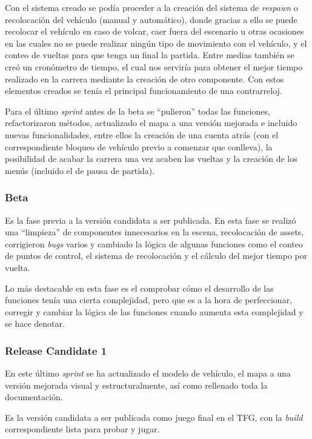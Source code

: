Con el sistema creado se podía proceder a la creación del sistema de \textit{respawn} o recolocación del vehículo (manual y automático), donde gracias a ello se puede recolocar el vehículo en caso de volcar, caer fuera del escenario u otras ocasiones en las cuales no se puede realizar ningún tipo de movimiento con el vehículo, y el conteo de vueltas para que tenga un final la partida. Entre medias también se creó un cronómetro de tiempo, el cual nos serviría para obtener el mejor tiempo realizado en la carrera mediante la creación de otro componente. Con estos elementos creados se tenía el principal funcionamiento de una contrarreloj.

Para el último \textit{sprint} antes de la beta se ``pulieron'' todas las funciones, refactorizaron métodos, actualizado el mapa a una versión mejorada e incluido nuevas funcionalidades, entre ellos la creación de una cuenta atrás (con el correspondiente bloqueo de vehículo previo a comenzar que conlleva), la posibilidad de acabar la carrera una vez acaben las vueltas y la creación de los menús (incluido el de pausa de partida).

\subsubsection{Beta}

Es la fase previa a la versión candidata a ser publicada. En esta fase se realizó una ``limpieza'' de componentes innecesarios en la escena, recolocación de assets, corrigieron \textit{bugs} varios y cambiado la lógica de algunas funciones como el conteo de puntos de control, el sistema de recolocación y el cálculo del mejor tiempo por vuelta.

Lo más destacable en esta fase es el comprobar cómo el desarrollo de las funciones tenía una cierta complejidad, pero que es a la hora de perfeccionar, corregir y cambiar la lógica de las funciones cuando aumenta esta complejidad y se hace denotar.

\subsubsection{Release Candidate 1}

En este último \textit{sprint} se ha actualizado el modelo de vehículo, el mapa a una versión mejorada visual y estructuralmente, así como rellenado toda la documentación.

Es la versión candidata a ser publicada como juego final en el TFG, con la \textit{build} correspondiente lista para probar y jugar.

